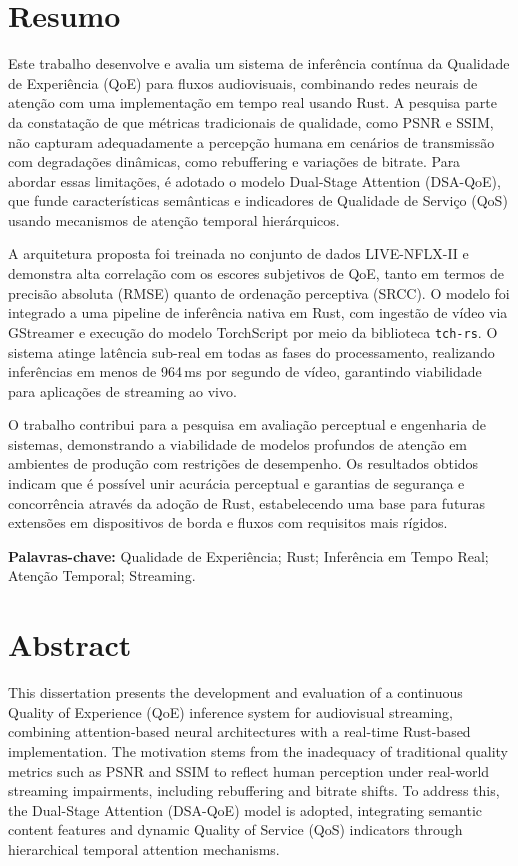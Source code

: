 \chapter*{Resumo}
Este trabalho desenvolve e avalia um sistema de inferência contínua da Qualidade de Experiência (QoE) para fluxos audiovisuais, combinando redes neurais de atenção com uma implementação em tempo real usando Rust. A pesquisa parte da constatação de que métricas tradicionais de qualidade, como PSNR e SSIM, não capturam adequadamente a percepção humana em cenários de transmissão com degradações dinâmicas, como rebuffering e variações de bitrate. Para abordar essas limitações, é adotado o modelo Dual-Stage Attention (DSA-QoE), que funde características semânticas e indicadores de Qualidade de Serviço (QoS) usando mecanismos de atenção temporal hierárquicos.

A arquitetura proposta foi treinada no conjunto de dados LIVE-NFLX-II e demonstra alta correlação com os escores subjetivos de QoE, tanto em termos de precisão absoluta (RMSE) quanto de ordenação perceptiva (SRCC). O modelo foi integrado a uma pipeline de inferência nativa em Rust, com ingestão de vídeo via GStreamer e execução do modelo TorchScript por meio da biblioteca \texttt{tch-rs}. O sistema atinge latência sub-real em todas as fases do processamento, realizando inferências em menos de 964\,ms por segundo de vídeo, garantindo viabilidade para aplicações de streaming ao vivo.

O trabalho contribui para a pesquisa em avaliação perceptual e engenharia de sistemas, demonstrando a viabilidade de modelos profundos de atenção em ambientes de produção com restrições de desempenho. Os resultados obtidos indicam que é possível unir acurácia perceptual e garantias de segurança e concorrência através da adoção de Rust, estabelecendo uma base para futuras extensões em dispositivos de borda e fluxos com requisitos mais rígidos.

\textbf{Palavras-chave:} Qualidade de Experiência; Rust; Inferência em Tempo Real; Atenção Temporal; Streaming.


\chapter*{Abstract}
This dissertation presents the development and evaluation of a continuous Quality of Experience (QoE) inference system for audiovisual streaming, combining attention-based neural architectures with a real-time Rust-based implementation. The motivation stems from the inadequacy of traditional quality metrics such as PSNR and SSIM to reflect human perception under real-world streaming impairments, including rebuffering and bitrate shifts. To address this, the Dual-Stage Attention (DSA-QoE) model is adopted, integrating semantic content features and dynamic Quality of Service (QoS) indicators through hierarchical temporal attention mechanisms.


